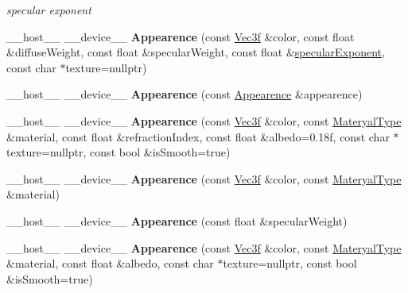 \begin{DoxyCompactItemize}
\begin{DoxyCompactList}\small\item\em specular exponent \end{DoxyCompactList}\item 
\+\_\+\+\_\+host\+\_\+\+\_\+ \+\_\+\+\_\+device\+\_\+\+\_\+ {\bfseries Appearence} (const \hyperlink{class_vec3}{Vec3f} \&color, const float \&diffuse\+Weight, const float \&specular\+Weight, const float \&\hyperlink{struct_appearence_a6bc3ec94dc3c32295d63b09413a78252}{specular\+Exponent}, const char $\ast$texture=nullptr)\hypertarget{struct_appearence_aa99a891cc9fbedd2d11b5f927a4cce0e}{}\label{struct_appearence_aa99a891cc9fbedd2d11b5f927a4cce0e}

\item 
\+\_\+\+\_\+host\+\_\+\+\_\+ \+\_\+\+\_\+device\+\_\+\+\_\+ {\bfseries Appearence} (const \hyperlink{struct_appearence}{Appearence} \&appearence)\hypertarget{struct_appearence_a7cf2e7ec95fd1d245b4b2b22b6a2115c}{}\label{struct_appearence_a7cf2e7ec95fd1d245b4b2b22b6a2115c}

\item 
\+\_\+\+\_\+host\+\_\+\+\_\+ \+\_\+\+\_\+device\+\_\+\+\_\+ {\bfseries Appearence} (const \hyperlink{class_vec3}{Vec3f} \&color, const \hyperlink{group__wrapping__and__description_ga4415a3504a4255d8563ded7496546564}{Materyal\+Type} \&material, const float \&refraction\+Index, const float \&albedo=0.\+18f, const char $\ast$texture=nullptr, const bool \&is\+Smooth=true)\hypertarget{struct_appearence_a622c0e5e935f1a9da3bff963e2b8d6d6}{}\label{struct_appearence_a622c0e5e935f1a9da3bff963e2b8d6d6}

\item 
\+\_\+\+\_\+host\+\_\+\+\_\+ \+\_\+\+\_\+device\+\_\+\+\_\+ {\bfseries Appearence} (const \hyperlink{class_vec3}{Vec3f} \&color, const \hyperlink{group__wrapping__and__description_ga4415a3504a4255d8563ded7496546564}{Materyal\+Type} \&material)\hypertarget{struct_appearence_ad14a7f8346717aaef5c3e06d64e5d98f}{}\label{struct_appearence_ad14a7f8346717aaef5c3e06d64e5d98f}

\item 
\+\_\+\+\_\+host\+\_\+\+\_\+ \+\_\+\+\_\+device\+\_\+\+\_\+ {\bfseries Appearence} (const float \&specular\+Weight)\hypertarget{struct_appearence_a457a7a1d0c4a661efb5448d01655e537}{}\label{struct_appearence_a457a7a1d0c4a661efb5448d01655e537}

\item 
\+\_\+\+\_\+host\+\_\+\+\_\+ \+\_\+\+\_\+device\+\_\+\+\_\+ {\bfseries Appearence} (const \hyperlink{class_vec3}{Vec3f} \&color, const \hyperlink{group__wrapping__and__description_ga4415a3504a4255d8563ded7496546564}{Materyal\+Type} \&material, const float \&albedo, const char $\ast$texture=nullptr, const bool \&is\+Smooth=true)\hypertarget{struct_appearence_abcd3db2310204d26344c19cf670b81e0}{}\label{struct_appearence_abcd3db2310204d26344c19cf670b81e0}


\end{DoxyCompactItemize}

